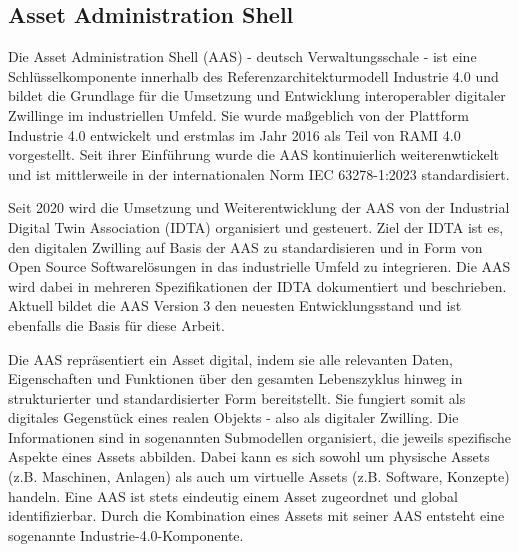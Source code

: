 

\newpage
\subsection{Asset Administration Shell}
Die Asset Administration Shell (AAS) - deutsch Verwaltungsschale - ist eine Schlüsselkomponente innerhalb des Referenzarchitekturmodell Industrie 4.0 \cite{RAMI4.0} und bildet die Grundlage für die Umsetzung und Entwicklung interoperabler digitaler Zwillinge im industriellen Umfeld.
Sie wurde maßgeblich von der Plattform Industrie 4.0 entwickelt und erstmlas im Jahr 2016 als Teil von RAMI 4.0 vorgestellt.
Seit ihrer Einführung wurde die AAS kontinuierlich weiterenwtickelt und ist mittlerweile in der internationalen Norm IEC 63278-1:2023 \cite{AASIEC63278} standardisiert.

Seit 2020 wird die Umsetzung und Weiterentwicklung der AAS von der Industrial Digital Twin Association (IDTA) organisiert und gesteuert.
Ziel der IDTA ist es, den digitalen Zwilling auf Basis der AAS zu standardisieren und in Form von Open Source Softwarelösungen in das industrielle Umfeld zu integrieren.
Die AAS wird dabei in mehreren Spezifikationen der IDTA dokumentiert und beschrieben.
Aktuell bildet die AAS Version 3 den neuesten Entwicklungsstand und ist ebenfalls die Basis für diese Arbeit.



Die AAS repräsentiert ein Asset digital, indem sie alle relevanten Daten, Eigenschaften und Funktionen über den gesamten Lebenszyklus hinweg in strukturierter und standardisierter Form bereitstellt. 
Sie fungiert somit als digitales Gegenstück eines realen Objekts - also als digitaler Zwilling.
Die Informationen sind in sogenannten Submodellen organisiert, die jeweils spezifische Aspekte eines Assets abbilden.
Dabei kann es sich sowohl um physische Assets (z.B. Maschinen, Anlagen) als auch um virtuelle Assets (z.B. Software, Konzepte) handeln. 
Eine AAS ist stets eindeutig einem Asset zugeordnet und global identifizierbar. 
Durch die Kombination eines Assets mit seiner AAS entsteht eine sogenannte Industrie-4.0-Komponente.

